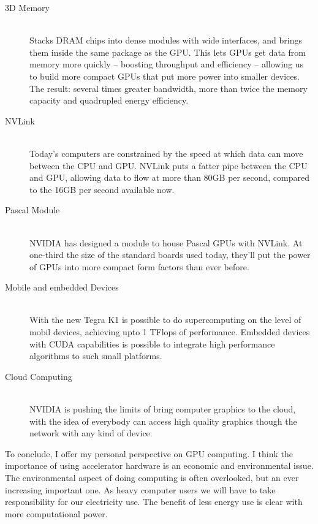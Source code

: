 \begin{description}
  \item[3D Memory] \hfill \\
 Stacks DRAM chips into dense modules with wide interfaces, and brings them inside the same package as the GPU. This lets GPUs get data from memory more quickly – boosting throughput and efficiency – allowing us to build more compact GPUs that put more power into smaller devices. The result: several times greater bandwidth, more than twice the memory capacity and quadrupled energy efficiency.
  
  \item[NVLink] \hfill \\
 Today’s computers are constrained by the speed at which data can move between the CPU and GPU. NVLink puts a fatter pipe between the CPU and GPU, allowing data to flow at more than 80GB per second, compared to the 16GB per second available now.
 
 \item[Pascal Module] \hfill \\ 
  NVIDIA has designed a module to house Pascal GPUs with NVLink. At one-third the size of the standard boards used today, they’ll put the power of GPUs into more compact form factors than ever before.
  
   \item[Mobile and embedded Devices] \hfill \\ 
   With the new Tegra K1 is possible to do supercomputing on the level of mobil devices, achieving upto 1 TFlops of performance. Embedded devices with CUDA capabilities is possible to integrate high performance algorithms to such small platforms. 
   \item[Cloud Computing] \hfill \\ 
   NVIDIA is pushing the limits of bring computer graphics to the cloud, with the idea of everybody can access high quality graphics though the network with any kind of device.
 
  \end{description}

To conclude, I offer my personal perspective on GPU computing. I think the importance of using accelerator hardware is an economic and environmental issue. The environmental aspect of doing computing is often overlooked, but an ever increasing important one. As heavy computer users we will have to take responsibility for our electricity use. The benefit of less energy use is clear with more computational power.